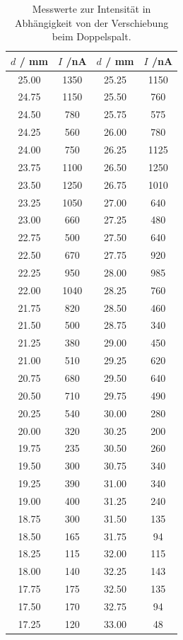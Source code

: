   \begin{table}
    \caption{Messwerte zur Intensität in Abhängigkeit von der Verschiebung beim Doppelspalt.}
    \centering
    \label{tab:messwerte2}
    \begin{tabular}{c c | c c}
      \toprule
$d$ / \si{\milli\meter} & $I$ /\si{\nano\ampere} & $d$ / \si{\milli\meter} & $I$ /\si{\nano\ampere}\\
     \midrule
25.00 & 1350	& 25.25 & 1150 \\
24.75 & 1150	& 25.50 & 760 \\
24.50 & 780	& 25.75 & 575 \\
24.25 & 560	& 26.00 & 780 \\
24.00 & 750	& 26.25 & 1125 \\
23.75 & 1100	& 26.50 & 1250 \\
23.50 & 1250	& 26.75 & 1010 \\
23.25 & 1050 &	27.00 & 640 \\
23.00 & 660	& 27.25 & 480 \\
22.75 & 500	& 27.50 & 640 \\
22.50 & 670	& 27.75 & 920 \\
22.25 & 950	& 28.00 & 985 \\
22.00 & 1040	& 28.25 & 760 \\
21.75 & 820	& 28.50 & 460 \\
21.50 & 500	& 28.75 & 340 \\
21.25 & 380	& 29.00 & 450 \\
21.00 & 510	& 29.25 & 620 \\
20.75 & 680	& 29.50 & 640 \\
20.50 & 710	& 29.75 & 490 \\
20.25 & 540	& 30.00 & 280 \\
20.00 & 320	& 30.25 & 200 \\
19.75 & 235	& 30.50 & 260 \\
19.50 & 300	& 30.75 & 340 \\
19.25 & 390	& 31.00 & 340 \\
19.00 & 400	& 31.25 & 240 \\
18.75 & 300	& 31.50 & 135 \\
18.50 & 165	& 31.75 & 94 \\
18.25 & 115	& 32.00 & 115 \\
18.00 & 140	& 32.25 & 143 \\
17.75 & 175	& 32.50 & 135 \\
17.50 & 170	& 32.75 & 94 \\
17.25 & 120	& 33.00 & 48 \\

\end{tabular}
\end{table}

